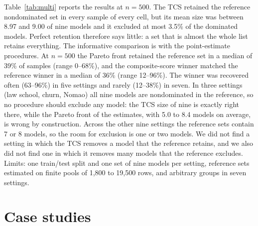 \documentclass[11pt,a4paper]{article}
\begin{document}
Table~\ref{tab:multi} reports the results at $n=500$. The TCS retained the reference nondominated set in every sample of every cell, but its mean size was between 8.97 and 9.00 of nine models and it excluded at most 3.5\% of the dominated models. Perfect retention therefore says little: a set that is almost the whole list retains everything. The informative comparison is with the point-estimate procedures. At $n=500$ the Pareto front retained the reference set in a median of 39\% of samples (range 0--68\%), and the composite-score winner matched the reference winner in a median of 36\% (range 12--96\%). The winner was recovered often (63--96\%) in five settings and rarely (12--38\%) in seven. In three settings (law school, churn, Nomao) all nine models are nondominated in the reference, so no procedure should exclude any model: the TCS size of nine is exactly right there, while the Pareto front of the estimates, with 5.0 to 8.4 models on average, is wrong by construction. Across the other nine settings the reference sets contain 7 or 8 models, so the room for exclusion is one or two models. We did not find a setting in which the TCS removes a model that the reference retains, and we also did not find one in which it removes many models that the reference excludes. Limits: one train/test split and one set of nine models per setting, reference sets estimated on finite pools of 1,800 to 19,500 rows, and arbitrary groups in seven settings.

\begin{table}[h]\centering\small
\caption{Twelve data settings at $n=500$ (150--200 samples each). Pool: size of the held-out pool. Naive front: Pareto front of the point estimates. Retention: share of samples in which all reference-nondominated models were kept. Winner correct: share of samples whose composite-score winner equals the reference winner. arb.: arbitrary group.}\label{tab:multi}

\end{table}

\section{Case studies}
\end{document}
